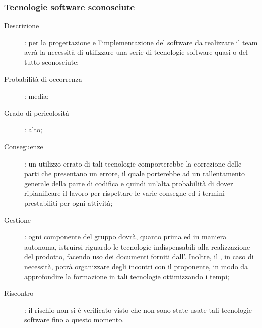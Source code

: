 \documentclass[../PianoDiProgetto.tex]{subfiles}
\begin{document}
		\subsubsection{Tecnologie software sconosciute}	
		\begin{description}
			\item [Descrizione]: per la progettazione e l'implementazione del software da realizzare il team avrà la necessità di utilizzare una serie di tecnologie software quasi o del tutto sconosciute;
			\item [Probabilità di occorrenza]: media;
			\item [Grado di pericolosità]: alto;
			\item [Conseguenze]: un utilizzo errato di tali tecnologie comporterebbe la correzione delle parti che presentano un errore, il quale porterebbe ad un rallentamento generale della parte di codifica e quindi un'alta probabilità di dover ripianificare il lavoro per rispettare le varie consegne ed i termini prestabiliti per ogni attività;
			\item [Gestione]: ogni componente del gruppo dovrà, quanto prima ed in maniera autonoma, istruirsi riguardo le tecnologie indispensabili alla realizzazione del prodotto, facendo uso dei documenti forniti dall’\amministratore. Inoltre, il \responsabilediprogetto, in caso di necessità, potrà organizzare degli incontri con il proponente, in modo da approfondire la formazione in tali tecnologie ottimizzando i tempi;
			\item [Riscontro]: il rischio non si è verificato visto che non sono state
			usate tali tecnologie software fino a questo momento.
		\end{description}
	
\end{document}
